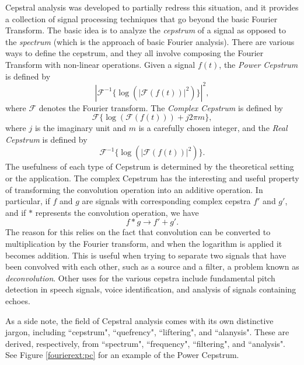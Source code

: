 Cepstral analysis was developed to partially redress this situation, and it provides a collection of signal
processing techniques that go beyond the basic Fourier Transform.
The basic idea is to analyze the \emph{cepstrum} of a signal as opposed to the \emph{spectrum} (which is the approach of basic Fourier analysis).
There are various ways to define the cepstrum, and they all involve composing the Fourier Transform with non-linear operations.
Given a signal $f(t)$, the \emph{Power Cepstrum} is defined by
$$
\left|\mathcal{F}^{-1}\{\log(|\mathcal{F}(f(t))|^2)\}\right|^2,
$$
where $\mathcal{F}$ denotes the Fourier transform. The \emph{Complex Cepstrum} is defined by
$$
\mathcal{F}\{\log(\mathcal{F}(f(t)))+j2\pi m\},
$$
where $j$ is the imaginary unit and $m$ is a carefully chosen integer, and the \emph{Real Cepstrum}
is defined by
$$
\mathcal{F}^{-1}\{\log(|\mathcal{F}(f(t))|^2)\}.
$$
The usefulness of each type of Cepstrum is determined by the theoretical setting or the application.
The complex Cepstrum has the interesting and useful property of transforming the convolution operation into an additive operation.
In particular, if $f$ and $g$ are signals with corresponding complex cepstra $f'$ and $g'$, and if $*$ represents the convolution operation, we have
$$
f * g \rightarrow f' + g'.
$$
The reason for this relies on the fact that convolution can be converted to multiplication by the Fourier transform, and when the logarithm is applied it becomes addition.
This is useful when trying to separate two signals that have been convolved with each other, such as a source and a filter, a problem known as \emph{deconvolution}.
Other uses for the various cepstra include fundamental pitch detection in speech signals, voice identification, and analysis of signals containing echoes.

As a side note, the field of Cepstral analysis comes with its own distinctive jargon, including ``cepstrum",
``quefrency", ``liftering", and ``alanysis". These are derived, respectively, from ``spectrum",
``frequency", ``filtering", and ``analysis". See Figure \ref{fourierext:pc} for an example of the Power
Cepstrum.

